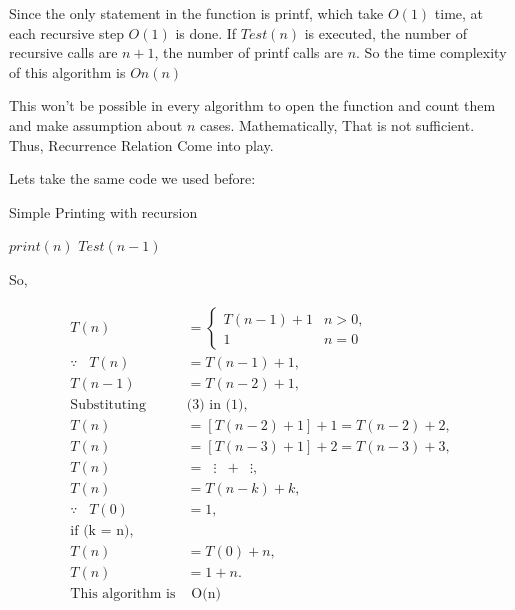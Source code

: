 \documentclass[]{article}
\begin{document}
Since the only statement in the function is printf, which take $O(1)$ time, at each recursive step $O(1)$ is done. If $Test(n)$ is executed, the number of recursive calls are $n+1$, the number of printf calls are $n$.
So the time complexity of this algorithm is $On(n)$

This won't be possible in every algorithm to open the function and count them and make assumption about $n$ cases. Mathematically, That is not sufficient. Thus, Recurrence Relation Come into play.

Lets take the same code we used before:

\begin{algorithm}[H]
    \caption{Simple Printing with recursion}
    \label{printRecursion}
    \begin{algorithmic}
         
            \State$print(n)$ 
            \State$Test(n-1)$  
        \EndIf
        \EndProcedure
    \end{algorithmic}
\end{algorithm}

So,

\[
\begin{aligned}
    T(n) &=
    \begin{cases}
        T(n - 1) + 1 \label{base} & n > 0, \\
        1 & n = 0
    \end{cases} \\
    \because \hspace{10pt} T(n) &= T(n - 1) + 1, \\
    T(n - 1) &= T(n - 2) + 1, \\
    \text{Substituting} & \text{(3) in (1)}, \\
    T(n) &= [T(n - 2) + 1] + 1 = T(n - 2) + 2, \\
    T(n) &= [T(n - 3) + 1] + 2 = T(n - 3) + 3, \\
    T(n) &= \hspace{7pt}\vdots \hspace{7pt}+\hspace{7pt} \vdots, \\
    T(n) &= T(n - k) + k, \\
    \because \hspace{10pt} T(0) &= 1, \\
    \text{if (k = n)}, \\
    T(n) &= T(0) + n, \\
    T(n) &= 1 + n.\\
    \text{This algorithm is} & \text{ O(n)}
\end{aligned}
\]
\end{document}
